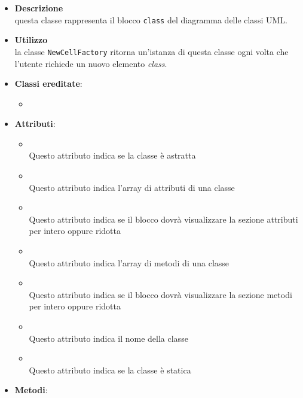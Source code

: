 \label{\nogloxy{swedesigner::client::model::celltypes::class::HxClass}}
\begin{itemize}
\item \textbf{Descrizione}\\
questa classe rappresenta il blocco \texttt{class} del diagramma delle classi UML.
\item \textbf{Utilizzo}\\
la classe \texttt{NewCellFactory} ritorna un'istanza di questa classe ogni volta che l'utente richiede un nuovo elemento \emph{class}.
\item \textbf{Classi ereditate}:
\begin{itemize}
\item \hyperref[\nogloxy{swedesigner::client::model::celltypes::class::ClassDiagramElement}]{}
\end{itemize}
\item \textbf{Attributi}:
\begin{itemize}
\item {}
\\ Questo attributo indica se la classe è astratta
\item {}
\\ Questo attributo indica l'array di attributi di una classe
\item {}
\\ Questo attributo indica se il blocco dovrà visualizzare la sezione attributi per intero oppure ridotta
\item {}
\\ Questo attributo indica l'array di metodi di una classe
\item {}
\\ Questo attributo indica se il blocco dovrà visualizzare la sezione metodi per intero oppure ridotta
\item {}
\\ Questo attributo indica il nome della classe
\item {}
\\ Questo attributo indica se la classe è statica
\end{itemize}
\item \textbf{Metodi}:
\begin{itemize}

\end{itemize}
\end{itemize}

